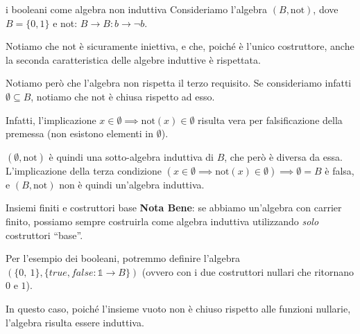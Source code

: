 \documentclass[a4paper,11pt]{report}
\begin{document}
\begin{gframe}[colframe=Orchid, colbacktitle=Orchid]{i booleani come algebra non induttiva}
    \label{Bool}
    Consideriamo l'algebra \( (B, \text{not}) \), dove \( B = \{0, 1\} \) e not: \(B \to B : b\to \neg b\).

    Notiamo che not è sicuramente iniettiva, e che, poiché è l'unico costruttore, anche la seconda caratteristica delle algebre induttive è rispettata.

    Notiamo però che l'algebra non rispetta il terzo requisito. Se consideriamo infatti \( \emptyset \subseteq B\), notiamo che not è chiusa rispetto ad esso. 

    Infatti, l'implicazione \( x \in \emptyset \implies \text{not}(x) \in \emptyset \) risulta vera per falsificazione della premessa (non esistono elementi in \( \emptyset \)).

    \( (\emptyset, \text{not}) \) è quindi una sotto-algebra induttiva di \( B \), che però è diversa da essa. L'implicazione della terza condizione \( (x \in \emptyset \implies \text{not}(x) \in \emptyset) \implies \emptyset = B \) è falsa, e \( (B, \text{not}) \) non è quindi un'algebra induttiva.

\begin{gframe}{Insiemi finiti e costruttori base}
    \textbf{Nota Bene}: se abbiamo un'algebra con carrier finito, possiamo sempre costruirla come algebra induttiva utilizzando \textit{solo} costruttori ``base''.

    Per l'esempio dei booleani, potremmo definire l'algebra \( (\{0, \ 1\}, \{true, false: \mathbb{1}\to B \} )\) (ovvero con i due costruttori nullari che ritornano \( 0 \) e \( 1 \)).

    In questo caso, poiché l'insieme vuoto non è chiuso rispetto alle funzioni nullarie, l'algebra risulta essere induttiva.
\end{gframe}

\end{gframe}
\end{document}
